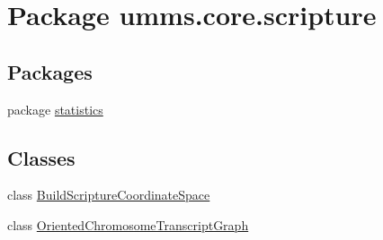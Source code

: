 \hypertarget{namespaceumms_1_1core_1_1scripture}{\section{Package umms.\+core.\+scripture}
\label{namespaceumms_1_1core_1_1scripture}
}
\subsection*{Packages}
\begin{DoxyCompactItemize}
\item 
package \hyperlink{namespaceumms_1_1core_1_1scripture_1_1statistics}{statistics}
\end{DoxyCompactItemize}
\subsection*{Classes}
\begin{DoxyCompactItemize}
\item 
class \hyperlink{classumms_1_1core_1_1scripture_1_1_build_scripture_coordinate_space}{Build\+Scripture\+Coordinate\+Space}
\item 
class \hyperlink{classumms_1_1core_1_1scripture_1_1_oriented_chromosome_transcript_graph}{Oriented\+Chromosome\+Transcript\+Graph}
\end{DoxyCompactItemize}
